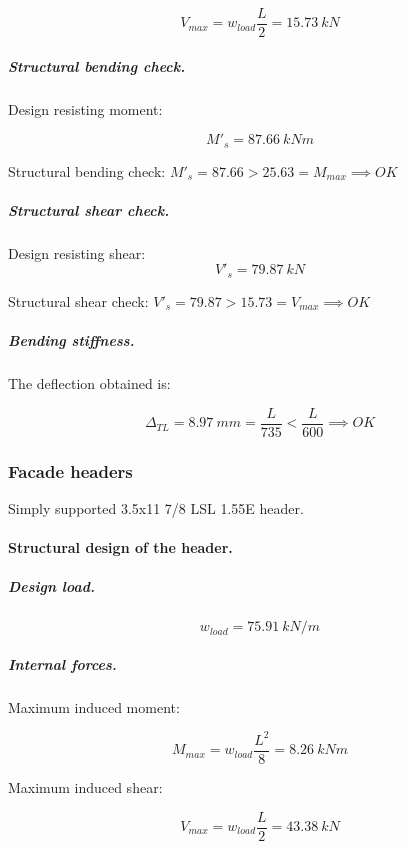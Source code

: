 \begin{equation}
  V_{max}= w_{load} \frac{L}{2}= 15.73\ kN
\end{equation}

\subparagraph{Structural bending check.}

\noindent Design resisting moment:

\begin{equation}
  M'_s= 87.66\ kN m
\end{equation}

\noindent Structural bending check: $M'_s = 87.66 > 25.63 = M_{max} \implies OK$

\subparagraph{Structural shear check.}

\noindent Design resisting shear:
\begin{equation}
  V'_s= 79.87\ kN
\end{equation}

\noindent Structural shear check: $V'_s = 79.87 > 15.73 = V_{max} \implies OK$

\subparagraph{Bending stiffness.}
The deflection obtained is:

\begin{equation}
  \Delta_{TL}= 8.97\ mm= \frac{L}{735} < \frac{L}{600} \implies OK
\end{equation}


\subsubsection{Facade headers}
Simply supported 3.5x11 7/8 LSL 1.55E header.

\paragraph{Structural design of the header.}

\subparagraph{Design load.}

\begin{equation}
  w_{load}= 75.91\ kN/m
\end{equation}

\subparagraph{Internal forces.}

\noindent Maximum induced moment:

\begin{equation}
  M_{max}= w_{load} \frac{L^2}{8}= 8.26\ kN m
\end{equation}

\noindent Maximum induced shear:

\begin{equation}
  V_{max}= w_{load} \frac{L}{2}= 43.38\ kN
\end{equation}

